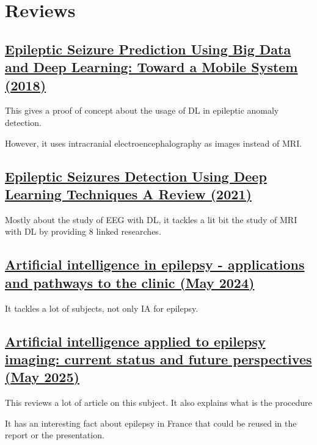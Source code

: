 \chapter{Reviews}

\section{\href{https://www.thelancet.com/article/S2352-3964(17)30470-X/fulltext}{Epileptic Seizure Prediction Using Big Data and Deep Learning: Toward a Mobile System (2018)}}

This gives a proof of concept about the usage of DL in epileptic anomaly detection.

However, it uses intracranial electroencephalography as images instead of MRI.

\section{\href{https://www.mdpi.com/1660-4601/18/11/5780\#B141-ijerph-18-05780}{Epileptic Seizures Detection Using Deep Learning Techniques A Review (2021)}}

Mostly about the study of EEG with DL, it tackles a lit bit the study of MRI with DL by providing 8 linked researches.

\section{\href{https://www.nature.com/articles/s41582-024-00965-9}{Artificial intelligence in epilepsy - applications and pathways to the clinic (May 2024)}}

It tackles a lot of subjects, not only IA for epilepsy.

\section{\href{https://www.sciencedirect.com/science/article/pii/S0035378725004874}{Artificial intelligence applied to epilepsy imaging: current status and future perspectives (May 2025)}}

This reviews a lot of article on this subject.
It also explains what is the procedure

It has an interesting fact about epilepsy in France that could be reused in the report or the presentation.


